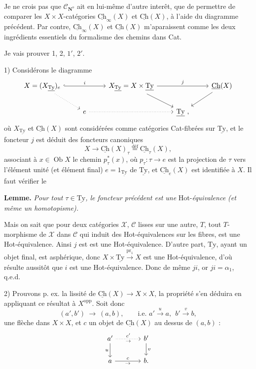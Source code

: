\documentclass[11pt]{article}
\newcommand{\printedpage}[1]{\marginpar{\footnotesize p.~#1}}
\newcommand{\msp}[1]{\marginpar{\footnotesize [#1]}}
\newcommand{\Ch}{\underline{\mathrm{Ch}}}
\newcommand{\Ty}{\underline{\mathrm{Ty}}}
\newcommand{\cC}{\mathcal{C}}
\newcommand{\cX}{\mathcal{X}}
\newcommand{\NN}{\mathbf{N}^{o}}
\newcommand{\Ob}{\operatorname{Ob}}
\begin{document}
Je ne crois pas que $\cC_{\NN}$ ait en lui-même d'autre interêt, que de permettre de comparer %
les $X \times X$-catégories $\Ch_{\infty}(X)$ et $\Ch(X)$, à l'aide du diagramme précédent. Par contre, $\Ch_{\infty}(X)$ et $\Ch(X)$ m'aparaissent comme les deux ingrédients essentiels du formalisme des %
chemins dans Cat.

\printedpage{100}
\msp{page 160}
Je vais prouver 1, 2, $1'$, $2'$.

1) Considérons le diagramme
\[
\begin{tikzcd}
X = (X_{\Ty})_e \ar[rr,hook,"i"] \ar[dr,dotted] & & X_{\Ty} = X \times \Ty \ar[rr,"j"] \ar[dr] & & \Ch(X) \ar[dl] \\
& e \ar[rr,dotted] & & \Ty\ , &
\end{tikzcd}
\]
où $X_{\Ty}$ et $\Ch(X)$ sont considérées comme catégories Cat-fibrées sur $\Ty$, et le foncteur $j$ est déduit des foncteurs canoniques
\[
X \longrightarrow \Ch(X)_{\tau} \overset{\text{déf}}{=} \Ch_{\tau}(X),
\]
associant à $x \in \Ob X$ le chemin $p_{\tau}^{*}(x)$, où $p_{\tau} : \tau \longrightarrow e$ est la projection de $\tau$ vers l'élément unité (et élément final) $e = 1_{\Ty}$ de $\Ty$, et $\Ch_{e}(X)$ est identifiée à $X$. Il faut vérifier le

\textbf{Lemme.} \textit{Pour tout $\tau \in \Ty$, le foncteur précédent est une} Hot-\textit{équivalence (et même un homotopisme).}

Mais on sait que pour deux catégories $\cX$, $\cC$ lisses sur une autre, $T$, tout $T$-morphisme de $\cX$ dans $\cC$ qui induit des Hot-équivalences sur les fibres, est une Hot-équivalence. Ainsi $j$ est
\msp{page 161}
est une Hot-équivalence. D'autre part, $\Ty$, ayant un objet final, est asphérique, donc %
$X \times \Ty \xrightarrow{\mathrm{pr}_1} X$ est une Hot-équivalence, d'où résulte aussitôt que $i$ est une Hot-équivalence. Donc de même $ji$, or $ji = \alpha_1$, q.e.d.

2) Prouvons p. ex. la lissité de $\Ch(X) \longrightarrow X \times X$, la propriété s'en déduira en appliquant ce résultat à $X^{\mathrm{opp}}$. Soit donc
\[
(a',b') \ \longrightarrow\ (a,b), \qquad \text{i.e. } a' \xrightarrow{u} a,\ \ b' \xrightarrow{v} b,
\]
une flèche dans $X \times X$, et $c$ un objet de $\Ch(X)$ au dessus de $(a,b)$ :
\[
\begin{tikzcd}[column sep=large]
a' \ar[r,dotted,"c'","\scriptstyle\rightarrow"'] \ar[d,"u"'] & b' \ar[d,"v"] \\
a \ar[r,"c","\scriptstyle\rightarrow"'] & b.
\end{tikzcd}
\]
\end{document}

